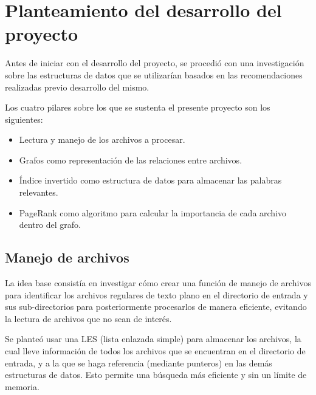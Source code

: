 \section{Planteamiento del desarrollo del proyecto}
Antes de iniciar con el desarrollo del proyecto, se procedió con una investigación sobre las estructuras de datos que se utilizarían basados en las recomendaciones realizadas previo desarrollo del mismo.

Los cuatro pilares sobre los que se sustenta el presente proyecto son los siguientes:
\begin{itemize}
    \item Lectura y manejo de los archivos a procesar.
    \item Grafos como representación de las relaciones entre archivos.
    \item Índice invertido como estructura de datos para almacenar las palabras relevantes.
    \item PageRank como algoritmo para calcular la importancia de cada archivo dentro del grafo.
\end{itemize}

\subsection{Manejo de archivos}
La idea base consistía en investigar cómo crear una función de manejo de archivos para identificar los archivos regulares de texto plano en el directorio de entrada y sus sub-directorios para posteriormente procesarlos de manera eficiente, evitando la lectura de archivos que no sean de interés.

Se planteó usar una LES (lista enlazada simple) para almacenar los archivos, la cual lleve información de todos los archivos que se encuentran en el directorio de entrada, y a la que se haga referencia (mediante punteros) en las demás estructuras de datos. Esto permite una búsqueda más eficiente y sin un límite de memoria.

